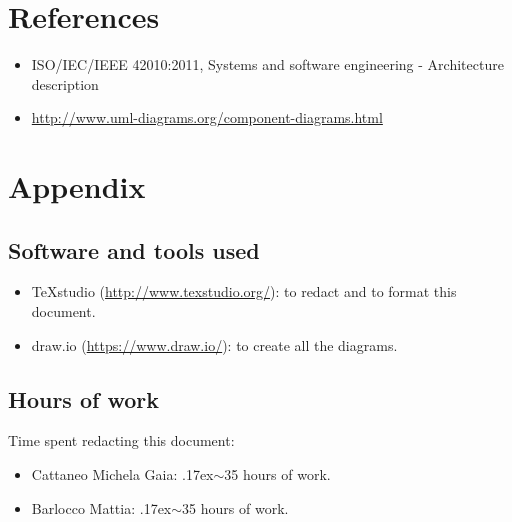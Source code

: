 \documentclass[18pt,oneside,a4paper, titlepage]{article}
\begin{document}
	\section{References}
		\begin{itemize}
			\item  ISO/IEC/IEEE 42010:2011, Systems and software engineering - Architecture description
			\item \url{http://www.uml-diagrams.org/component-diagrams.html}
		\end{itemize}
\newpage
	\section{Appendix}
		\subsection{Software and tools used}
				\begin{itemize}
					\item TeXstudio (\url{http://www.texstudio.org/}): to redact and to format this document.
					\item draw.io (\url{https://www.draw.io/}): to create all the diagrams.
				\end{itemize}
		\subsection{Hours of work}
			Time spent redacting this document:
			\begin{itemize}
				\item Cattaneo Michela Gaia: {\raise.17ex\hbox{$\scriptstyle\sim$}}35 hours of work.
				\item Barlocco Mattia: {\raise.17ex\hbox{$\scriptstyle\sim$}}35 hours of work.
			\end{itemize}
		
		
		
\end{document}
